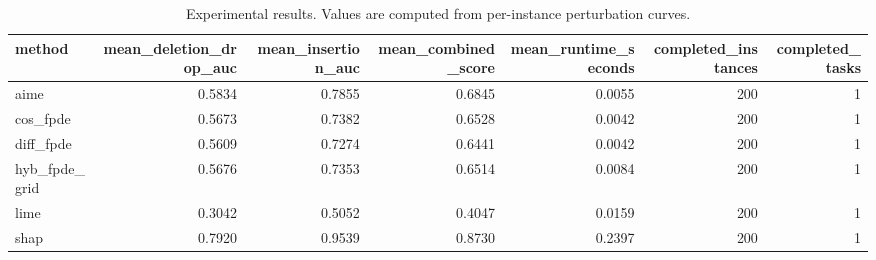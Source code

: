 \begin{table}[t]
\caption{Experimental results. Values are computed from per-instance perturbation curves.}
\label{tab:main_results_computed}
\centering
\begin{tabular}{lrrrrrr}
\toprule
method & mean\_deletion\_drop\_auc & mean\_insertion\_auc & mean\_combined\_score & mean\_runtime\_seconds & completed\_instances & completed\_tasks \\
\midrule
aime & 0.5834 & 0.7855 & 0.6845 & 0.0055 & 200 & 1 \\
cos\_fpde & 0.5673 & 0.7382 & 0.6528 & 0.0042 & 200 & 1 \\
diff\_fpde & 0.5609 & 0.7274 & 0.6441 & 0.0042 & 200 & 1 \\
hyb\_fpde\_grid & 0.5676 & 0.7353 & 0.6514 & 0.0084 & 200 & 1 \\
lime & 0.3042 & 0.5052 & 0.4047 & 0.0159 & 200 & 1 \\
shap & 0.7920 & 0.9539 & 0.8730 & 0.2397 & 200 & 1 \\
\bottomrule
\end{tabular}

\end{table}
